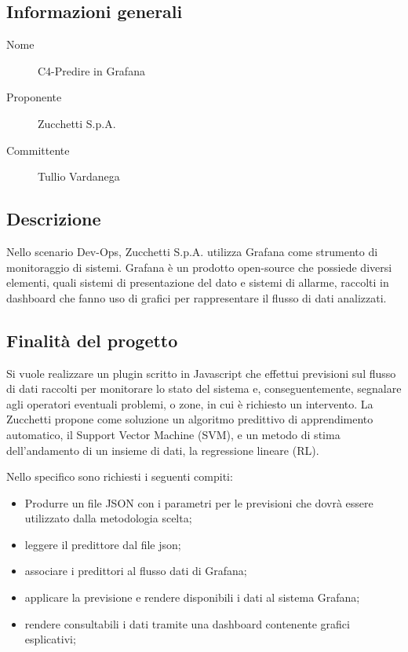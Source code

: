 \documentclass[../studio-di-fattibilita.tex]{subfiles}
\begin{document}
	\subsection{Informazioni generali}
	\label{subsec:informazioni_generali}
	\begin{description}
		\item[Nome] C4-Predire in Grafana
		\item[Proponente] Zucchetti S.p.A.
		\item[Committente] Tullio Vardanega
	\end{description}


	\subsection{Descrizione}
	\label{subsec:descrizione}
	Nello scenario Dev-Ops, Zucchetti S.p.A. utilizza Grafana come strumento di monitoraggio di sistemi.
	Grafana è un prodotto open-source che possiede diversi elementi, quali sistemi di presentazione del dato e sistemi di allarme, raccolti in dashboard che fanno uso di grafici per rappresentare il flusso di dati analizzati.


	\subsection{Finalità del progetto}
	\label{subsec:finalita_del_progetto}
	Si vuole realizzare un plugin scritto in Javascript che effettui previsioni sul flusso di dati raccolti per monitorare lo stato del sistema e, conseguentemente, segnalare agli operatori eventuali problemi, o zone, in cui è richiesto un intervento. La Zucchetti propone come soluzione un algoritmo predittivo di apprendimento automatico, il Support Vector Machine (SVM), e un metodo di stima dell'andamento di un insieme di dati, la regressione lineare (RL).

	Nello specifico sono richiesti i seguenti compiti:
	\begin{itemize}
		\item Produrre un file JSON con i parametri per le previsioni che dovrà essere utilizzato dalla metodologia scelta;
		\item leggere il predittore dal file json;
		\item associare i predittori al flusso dati di Grafana;
		\item applicare la previsione e rendere disponibili i dati al sistema Grafana;
		\item rendere consultabili i dati tramite una dashboard contenente grafici esplicativi;
	\end{itemize}
\end{document}
